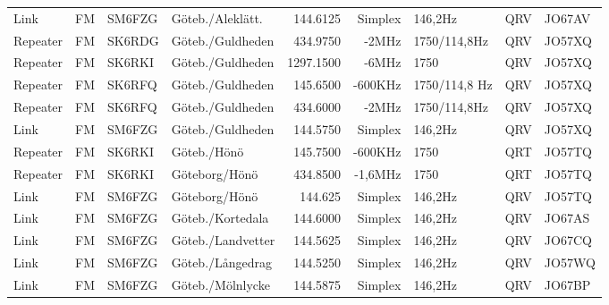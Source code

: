 \begin{landscape}
\begin{longtable}{llllrrlcl}
	Link              & FM           & SM6FZG        & Göteb./Aleklätt.    &          144.6125 &        Simplex & 146,2Hz         &       QRV       & JO67AV           \\
	Repeater          & FM           & SK6RDG        & Göteb./Guldheden    &          434.9750 &          -2MHz & 1750/114,8Hz    &       QRV       & JO57XQ           \\
	Repeater          & FM           & SK6RKI        & Göteb./Guldheden    &         1297.1500 &          -6MHz & 1750            &       QRV       & JO57XQ           \\
	Repeater          & FM           & SK6RFQ        & Göteb./Guldheden    &          145.6500 &        -600KHz & 1750/114,8 Hz   &       QRV       & JO57XQ           \\
	Repeater          & FM           & SK6RFQ        & Göteb./Guldheden    &          434.6000 &          -2MHz & 1750/114,8Hz    &       QRV       & JO57XQ           \\
	Link              & FM           & SM6FZG        & Göteb./Guldheden    &          144.5750 &        Simplex & 146,2Hz         &       QRV       & JO57XQ           \\
	Repeater          & FM           & SK6RKI        & Göteb./Hönö         &          145.7500 &        -600KHz & 1750            &       QRT       & JO57TQ           \\
	Repeater          & FM           & SK6RKI        & Göteborg/Hönö       &          434.8500 &        -1,6MHz & 1750            &       QRT       & JO57TQ           \\
	Link              & FM           & SM6FZG        & Göteborg/Hönö       &           144.625 &        Simplex & 146,2Hz         &       QRV       & JO57TQ           \\
	Link              & FM           & SM6FZG        & Göteb./Kortedala    &          144.6000 &        Simplex & 146,2Hz         &       QRV       & JO67AS           \\
	Link              & FM           & SM6FZG        & Göteb./Landvetter   &          144.5625 &        Simplex & 146,2Hz         &       QRV       & JO67CQ           \\
	Link              & FM           & SM6FZG        & Göteb./Långedrag    &          144.5250 &        Simplex & 146,2Hz         &       QRV       & JO57WQ           \\
	Link              & FM           & SM6FZG        & Göteb./Mölnlycke    &          144.5875 &        Simplex & 146,2Hz         &       QRV       & JO67BP           \\

\end{longtable}
\end{landscape}
